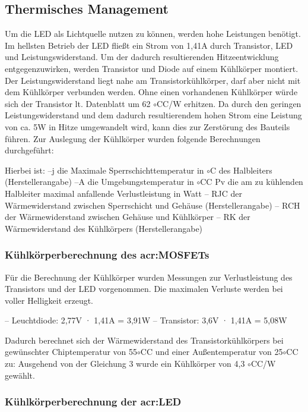\subsection{Thermisches Management}
\label{subsub:Unterunterabschnitt1}

Um die LED als Lichtquelle nutzen zu können, werden hohe Leistungen benötigt.
Im hellsten Betrieb der LED fließt ein Strom von 1,41A durch Transistor, LED
und Leistungswiderstand. Um der dadurch resultierenden Hitzeentwicklung entgegenzuwirken,
werden Transistor und Diode auf einem Kühlkörper montiert. Der
Leistungswiderstand liegt nahe am Transistorkühlkörper, darf aber nicht mit dem
Kühlkörper verbunden werden.
Ohne einen vorhandenen Kühlkörper würde sich der Transistor lt. Datenblatt um
62 $\circ$CC/W erhitzen. Da durch den geringen Leistungswiderstand und dem dadurch
resultierendem hohen Strom eine Leistung von ca. 5W in Hitze umgewandelt wird,
kann dies zur Zerstörung des Bauteils führen.
Zur Auslegung der Kühlkörper wurden folgende Berechnungen durchgeführt:

Hierbei ist:
–j die Maximale Sperrschichttemperatur in $\circ$C des Halbleiters (Herstellerangabe)
–A die Umgebungstemperatur in $\circ$CC
Pv die am zu kühlenden Halbleiter maximal anfallende Verlustleistung in
Watt
– RJC der Wärmewiderstand zwischen Sperrschicht und Gehäuse (Herstellerangabe)
– RCH der Wärmewiderstand zwischen Gehäuse und Kühlkörper
– RK der Wärmewiderstand des Kühlkörpers (Herstellerangabe)

\subsubsection{Kühlkörperberechnung des \gls{acr:MOSFET}s}
\label{subsub:Unterunterabschnitt1}

Für die Berechnung der Kühlkörper wurden Messungen zur Verlustleistung des
Transistors und der LED vorgenommen. Die maximalen Verluste werden bei voller
Helligkeit erzeugt.

– Leuchtdiode: 2,77V · 1,41A = 3,91W
– Transistor: 3,6V · 1,41A = 5,08W

Dadurch berechnet sich der Wärmewiderstand des Transistorkühlkörpers bei gewünschter
Chiptemperatur von 55$\circ$CC und einer Außentemperatur von 25$\circ$CC zu:
Ausgehend von der Gleichung 3 wurde ein Kühlkörper von 4,3 $\circ$CC/W gewählt.

\subsubsection{Kühlkörperberechnung der \gls{acr:LED}}
\label{subsub:Unterunterabschnitt1}

